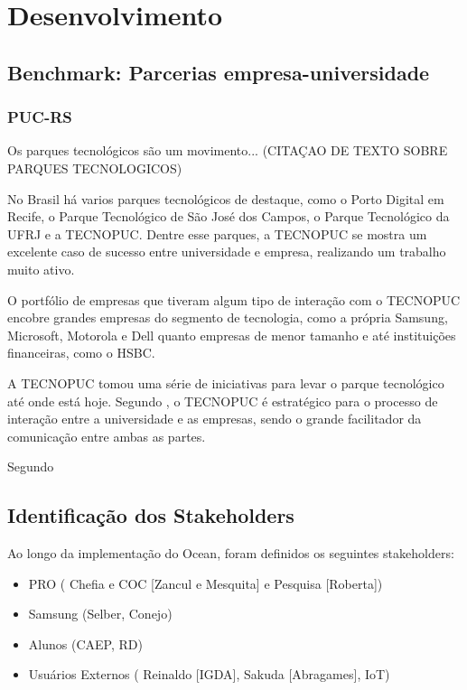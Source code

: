 \chapter{Desenvolvimento}
\label{cha:desenvolvimento}

\section{Benchmark: Parcerias empresa-universidade} %
\label{sec:cases}

\subsection{PUC-RS}

Os parques tecnológicos são um movimento... (CITAÇAO DE TEXTO SOBRE PARQUES TECNOLOGICOS)

No Brasil há varios parques tecnológicos de destaque, como o Porto Digital em Recife, o Parque Tecnológico de São José dos Campos, o Parque Tecnológico da UFRJ e a TECNOPUC. Dentre esse parques, a TECNOPUC se mostra um excelente caso de sucesso entre universidade e empresa, realizando um trabalho muito ativo.

O portfólio de empresas que tiveram algum tipo de interação com o TECNOPUC encobre grandes empresas do segmento de tecnologia, como a própria Samsung, Microsoft, Motorola e Dell quanto empresas de menor tamanho e até instituições financeiras, como o HSBC.

A TECNOPUC tomou uma série de iniciativas para levar o parque tecnológico até onde está hoje. Segundo , o TECNOPUC é estratégico para o processo de interação entre a universidade e as empresas, sendo o grande facilitador da comunicação entre ambas as partes.

Segundo 

\section{Identificação dos Stakeholders}
\label{sec:identificacao_stakeholders}

Ao longo da implementação do Ocean, foram definidos os seguintes stakeholders:

\begin{itemize}
\item PRO ( Chefia e COC [Zancul e Mesquita] e Pesquisa [Roberta])
\item Samsung (Selber, Conejo)
\item Alunos (CAEP, RD)
\item Usuários Externos ( Reinaldo [IGDA], Sakuda [Abragames], IoT)
\end{itemize}

